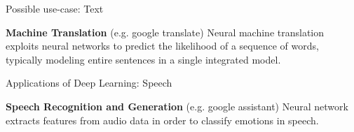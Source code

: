 \begin{frame} {Possible use-case: Text}
\begin{figure}
\centering
{}
\end{figure}
\textbf{Machine Translation} (e.g. google translate) 
Neural machine translation exploits neural networks to predict the likelihood of a sequence of words, typically modeling entire sentences in a single integrated model.
\end{frame}

\begin{frame} {Applications of Deep Learning: Speech}
\begin{figure}
\centering
{}
\end{figure}
\textbf{Speech Recognition and Generation} (e.g. google assistant)
Neural network extracts features from audio data in order to classify emotions in speech.
\end{frame}

\endlecture
